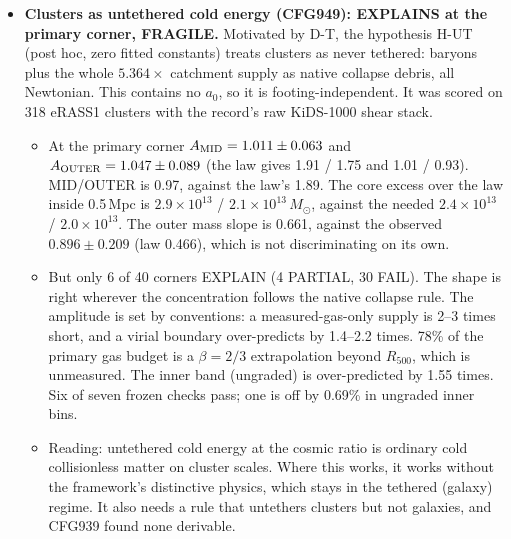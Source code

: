 \documentclass[10pt]{article}
\begin{document}
\begin{itemize}
\begin{itemize}
  \item The derived dynamics puts the NGC~1052 group below the law but cannot put Coma above it. That would need S4 or H-EX made real and derivable, which CFG939 found it is not. The frozen sign rule reads PREDICTED only technically. The mutation control fails as a power limit set by the systematics, as declared.
  \end{itemize}
\item \textbf{Clusters as untethered cold energy (CFG949): EXPLAINS at the primary corner, FRAGILE.} Motivated by D-T, the hypothesis H-UT (post hoc, zero fitted constants) treats clusters as never tethered: baryons plus the whole $5.364\times$ catchment supply as native collapse debris, all Newtonian. This contains no $a_0$, so it is footing-independent. It was scored on 318 eRASS1 clusters with the record's raw KiDS-1000 shear stack.
  \begin{itemize}
  \item At the primary corner $A_{\rm MID}=1.011\pm0.063$ and $A_{\rm OUTER}=1.047\pm0.089$ (the law gives 1.91 / 1.75 and 1.01 / 0.93). MID/OUTER is 0.97, against the law's 1.89. The core excess over the law inside 0.5\,Mpc is $2.9\times10^{13}$ / $2.1\times10^{13}\,M_\odot$, against the needed $2.4\times10^{13}$ / $2.0\times10^{13}$. The outer mass slope is 0.661, against the observed $0.896\pm0.209$ (law 0.466), which is not discriminating on its own.
  \item But only 6 of 40 corners EXPLAIN (4 PARTIAL, 30 FAIL). The shape is right wherever the concentration follows the native collapse rule. The amplitude is set by conventions: a measured-gas-only supply is 2--3 times short, and a virial boundary over-predicts by 1.4--2.2 times. 78\% of the primary gas budget is a $\beta=2/3$ extrapolation beyond $R_{500}$, which is unmeasured. The inner band (ungraded) is over-predicted by 1.55 times. Six of seven frozen checks pass; one is off by 0.69\% in ungraded inner bins.
  \item Reading: untethered cold energy at the cosmic ratio is ordinary cold collisionless matter on cluster scales. Where this works, it works without the framework's distinctive physics, which stays in the tethered (galaxy) regime. It also needs a rule that untethers clusters but not galaxies, and CFG939 found none derivable.
  \end{itemize}
\end{itemize}
\end{document}
